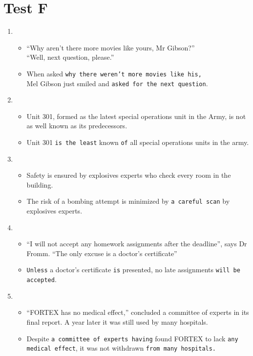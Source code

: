 \documentclass[a4paper]{article}
\begin{document}
\section{Test F}
\begin{enumerate}
    \item \begin{itemize}
        \item ``Why aren't there more movies like yours, Mr Gibson?'' \\ ``Well, next question, please.''
        \item When asked {\tt why there weren't more movies like his,}\\Mel Gibson just smiled and {\tt asked for the next question}.
    \end{itemize}
    \item \begin{itemize}
        \item Unit 301, formed as the latest special operations unit in the Army, is not as well known as its predecessors.
        \item Unit 301 {\tt is the least} known {\tt of} all special operations units in the army.
    \end{itemize}
    \item \begin{itemize}
        \item Safety is ensured by explosives experts who check every room in the building.
        \item The risk of a bombing attempt is minimized by {\tt a careful scan} by explosives experts.
    \end{itemize}
    \item \begin{itemize}
        \item ``I will not accept any homework assignments after the deadline'', says Dr Fromm. ``The only excuse is a doctor's certificate''
        \item {\tt Unless} a doctor's certificate {\tt is} presented, no late assignments {\tt will be accepted}.
    \end{itemize}
    \item \begin{itemize}
        \item ``FORTEX has no medical effect,'' concluded a committee of experts in its final report. A year later it was still used by many hospitals.
        \item Despite {\tt a committee of experts having} found FORTEX to lack {\tt any medical effect}, it was not withdrawn {\tt from many hospitals.}

\end{itemize}
\end{enumerate}
\end{document}
